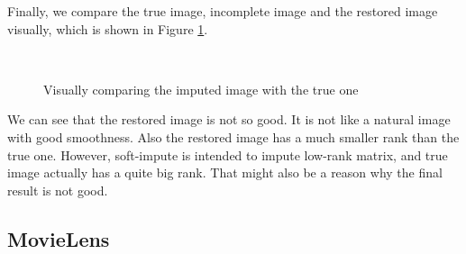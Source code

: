 \documentclass{article}
\begin{document}
	Finally, we compare the true image, incomplete image and the restored image visually, which is shown in Figure \ref{lena}.
	\begin{figure}[!htb]
    \centering
    ~ 
     ~ 
    \caption{Visually comparing the imputed image with the true one}
    \label{lena}
\end{figure}
	
	We can see that the restored image is not so good. It is not like a natural image with good smoothness. Also the restored image has a much smaller rank than the true one. However, soft-impute is intended to impute low-rank matrix, and true image actually has a quite big rank. That might also be a reason why the final result is not good.

	\subsection{MovieLens}
\end{document}
